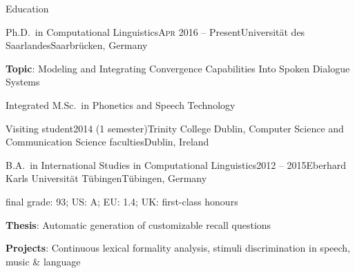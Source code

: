 \documentclass{resume} %
\begin{document}
\begin{rSection}{Education}

\begin{rSubsection}{Ph.D.\ in Computational Linguistics}{\textsc{Apr} 2016 -- Present}{Universität des Saarlandes}{Saarbrücken, Germany} %
	\setlength{\itemindent}{.7cm}
		
	\item \textbf{Topic}: Modeling and Integrating Convergence Capabilities Into Spoken Dialogue Systems %
	
	\item Integrated M.Sc.\ in Phonetics and Speech Technology
\end{rSubsection}

\begin{rSubsection}{Visiting student}{2014 (1 semester)}{Trinity College Dublin, Computer Science and Communication Science faculties}{Dublin, Ireland}
	\setlength{\itemindent}{.7cm}
	\item[]
	
\end{rSubsection}

\begin{rSubsection}{B.A.\ in International Studies in Computational Linguistics}{2012 -- 2015}{Eberhard Karls Universität Tübingen}{Tübingen, Germany}
	
\vspace*{-.2cm}
\item[]{final grade: 93; {\footnotesize US: A; EU: 1.4; UK: first-class honours}}
\vspace*{.2cm}

	\setlength{\itemindent}{.7cm}
	
	\item \textbf{Thesis}: Automatic generation of customizable recall questions
	
	\item \textbf{Projects}: Continuous lexical formality analysis, stimuli discrimination in speech, music \& language
	
\end{rSubsection}

\end{rSection}
\end{document}

